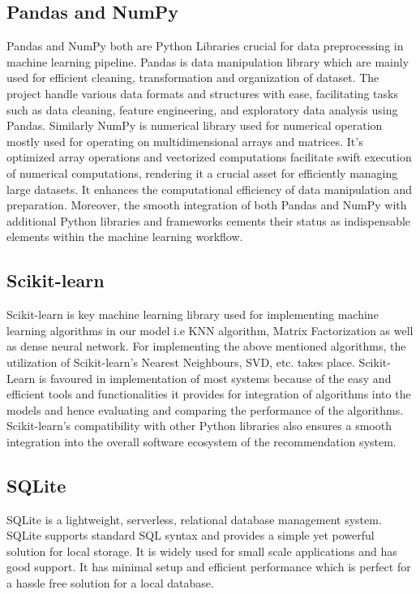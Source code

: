 \subsection*{Pandas and NumPy}
Pandas and NumPy both are Python Libraries crucial for data preprocessing in machine learning pipeline.
Pandas is data manipulation library which are mainly used for efficient cleaning, transformation and organization of dataset. The project handle various data formats and structures with ease, facilitating tasks such as data cleaning, feature engineering, and exploratory data analysis using Pandas.
Similarly NumPy is numerical library used for numerical operation mostly used for operating on multidimensional arrays and matrices. It's optimized array operations and vectorized computations facilitate swift execution of numerical computations, rendering it a crucial asset for efficiently managing large datasets. It enhances the computational efficiency of data manipulation and preparation. Moreover, the smooth integration of both Pandas and NumPy with additional Python libraries and frameworks cements their status as indispensable elements within the machine learning workflow.

\subsection*{Scikit-learn}
Scikit-learn is key machine learning library used for implementing machine learning algorithms in our model i.e KNN algorithm, Matrix Factorization as well as dense neural network.
For implementing the above mentioned algorithms, the utilization of Scikit-learn's  Nearest Neighbours, SVD, etc. takes place. Scikit-Learn is favoured in implementation of most systems because of the easy and efficient tools and functionalities it provides for integration of algorithms into the models and hence evaluating and comparing the performance of the algorithms. Scikit-learn's compatibility with other Python libraries also  ensures a smooth integration into the overall software ecosystem of the recommendation system.


\subsection*{SQLite}

SQLite is a lightweight, serverless, relational database management system. SQLite supports standard SQL syntax and provides a simple yet powerful solution for local storage. It is widely used for small scale applications and has good support. It has minimal setup and efficient performance which is perfect for a hassle free solution for a local database.

